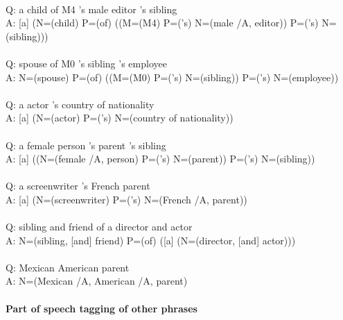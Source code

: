 \documentclass{article} \usepackage{iclr2022_conference,times}
\begin{document}
{ \\
Q: a child of M4 's male editor 's sibling \\
A: [a] (N=(child) P=(of) ((M=(M4) P=('s) N=(male /A, editor)) P=('s) N=(sibling))) \\
 \\
Q: spouse of M0 's sibling 's employee \\
A: N=(spouse) P=(of) ((M=(M0) P=('s) N=(sibling)) P=('s) N=(employee)) \\
 \\
Q: a actor 's country of nationality \\
A: [a] (N=(actor) P=('s) N=(country of nationality)) \\
 \\
Q: a female person 's parent 's sibling \\
A: [a] ((N=(female /A, person) P=('s) N=(parent)) P=('s) N=(sibling)) \\
 \\
Q: a screenwriter 's French parent \\
A: [a] (N=(screenwriter) P=('s) N=(French /A, parent)) \\
 \\
Q: sibling and friend of a director and actor \\
A: N=(sibling, [and] friend) P=(of) ([a] (N=(director, [and] actor))) \\
 \\
Q: Mexican American parent \\
A: N=(Mexican /A, American /A, parent)}

\paragraph{Part of speech tagging of other phrases}
\end{document}
